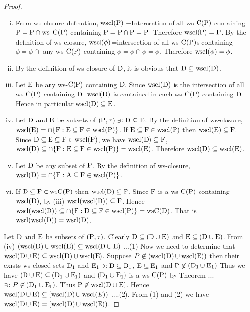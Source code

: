 \begin{proof}
\begin{enumerate}[(i)]
\item From ws-closure defination, $\mathrm{wscl}(\mathrm{P})$ =Intersection of all ws-$\mathrm{C}(\mathrm{P})$ containing $\mathrm{P} =\mathrm{P} \cap \mathrm{ws}$-$\mathrm{C}(\mathrm{P})$ containing $\mathrm{P}=\mathrm{P}\cap \mathrm{P} =\mathrm{P}$, Therefore $\mathrm{wscl}(\mathrm{P})=\mathrm{P}$. By the definition of ws-closure, $\mathrm{wscl}(\phi)$=intersection of all ws-$\mathrm{C}(\mathrm{P})$s containing $\phi =\phi\cap$  any ws-$\mathrm{C}(\mathrm{P})$ containing $\phi= \phi\cap \phi=\phi$. Therefore $\mathrm{wscl}(\phi)=\phi$.

\item By the definition of ws-closure of $\mathrm{D}$, it is obvious that $\mathrm{D}\subseteq  \mathrm{wscl}(\mathrm{D})$.

\item Let $\mathrm{E}$ be any ws-$\mathrm{C}(\mathrm{P})$ containing $\mathrm{D}$. Since $\mathrm{wscl}(\mathrm{D})$ is the intersection of all ws-$\mathrm{C}(\mathrm{P})$ containing $\mathrm{D}$. $\mathrm{wscl}(\mathrm{D})$ is contained in each ws-$\mathrm{C}(\mathrm{P})$ containing $\mathrm{D}$. Hence in particular $\mathrm{wscl}(\mathrm{D})\subseteq \mathrm{E}$.

\item Let $\mathrm{D}$ and $\mathrm{E}$  be subsets of $(\mathrm{P},\tau) \ni: \mathrm{D}\subseteq \mathrm{E}$. By the definition of ws-closure, $\mathrm{wscl}(\mathrm{E})=\cap \{\mathrm{F}: \mathrm{E}\subseteq \mathrm{F}\in \mathrm{wscl}(\mathrm{P})\}$. If $\mathrm{E}\subseteq \mathrm{F}\in \mathrm{wscl}(\mathrm{P})$ then $\mathrm{wscl}(\mathrm{E})\subseteq \mathrm{F}$. Since $\mathrm{D}\subseteq \mathrm{E} \subseteq \mathrm{F}\in \mathrm{wscl}(\mathrm{P})$, we have $\mathrm{wscl}(\mathrm{D})\subseteq \mathrm{F}$, $\mathrm{wscl}(\mathrm{D})\subseteq \cap \{\mathrm{F}: \mathrm{E}\subseteq \mathrm{F}\in \mathrm{wscl}(\mathrm{P})\}=\mathrm{wscl}(\mathrm{E})$. Therefore $\mathrm{wscl}(\mathrm{D})\subseteq \mathrm{wscl}(\mathrm{E})$.

\item Let $\mathrm{D}$ be any subset of $\mathrm{P}$. By the definition of ws-closure, $\mathrm{wscl}(\mathrm{D})=\cap \{\mathrm{F}: \mathrm{A}\subseteq \mathrm{F} \in \mathrm{wscl}(\mathrm{P})\}$.

\item If $\mathrm{D}\subseteq \mathrm{F}\in \mathrm{ws}\mathrm{C}(\mathrm{P})$ then $\mathrm{wscl}(\mathrm{D})\subseteq \mathrm{F}$. Since $\mathrm{F}$ is a ws-$\mathrm{C}(\mathrm{P})$ containing $\mathrm{wscl}(\mathrm{D})$, by (iii) $\mathrm{wscl}(\mathrm{wscl}(\mathrm{D}))\subseteq \mathrm{F}$. Hence $\mathrm{wscl}(\mathrm{wscl}(\mathrm{D}))\subseteq \cap \{\mathrm{F}: \mathrm{D}\subseteq \mathrm{F}\in \mathrm{wscl}(\mathrm{P})\}=\mathrm{ws} \mathrm{C}(\mathrm{D})$. That is $\mathrm{wscl}(\mathrm{wscl}(\mathrm{D}))=\mathrm{wscl}(\mathrm{D})$. 
\end{enumerate}

Let $\mathrm{D}$ and $\mathrm{E}$  be subsets of $(\mathrm{P},\tau)$. Clearly $\mathrm{D}\subseteq (\mathrm{D}\cup \mathrm{E})$ and $\mathrm{E}\subseteq (\mathrm{D}\cup \mathrm{E})$. From (iv) $(\mathrm{wscl}(\mathrm{D})\cup \mathrm{wscl}(\mathrm{E}))\subseteq \mathrm{wscl}(\mathrm{D}\cup \mathrm{E})$ ...(1) Now we need to determine that $\mathrm{wscl}(\mathrm{D}\cup \mathrm{E})\subseteq \mathrm{wscl}(\mathrm{D})\cup \mathrm{wscl}(\mathrm{E})$. Suppose $P\not\in (\mathrm{wscl}(\mathrm{D})\cup \mathrm{wscl}(\mathrm{E}))$ then their exists ws-closed sets $\mathrm{D}_{1}$ and $\mathrm{E}_{1}\ni: \mathrm{D}\subseteq \mathrm{D}_{1}$, $\mathrm{E}\subseteq \mathrm{E}_{1}$ and $\mathrm{P}\not\in (\mathrm{D}_{1} \cup \mathrm{E}_{1})$ Thus we have $(\mathrm{D}\cup \mathrm{E})\subseteq (\mathrm{D}_{1} \cup \mathrm{E}_{1})$ and $(\mathrm{D}_{1} \cup \mathrm{E}_{1})$ is a ws-$\mathrm{C}(\mathrm{P})$ by Theorem ... $\ni: P\not\in (\mathrm{D}_{1} \cup \mathrm{E}_{1})$. Thus $\mathrm{P}\not\in \mathrm{wscl}(\mathrm{D}\cup \mathrm{E})$. Hence $\mathrm{wscl}(\mathrm{D}\cup \mathrm{E})\subseteq (\mathrm{wscl}(\mathrm{D})\cup \mathrm{wscl}(E))$ ....(2). From (1) and (2) we have $\mathrm{wscl}(\mathrm{D}\cup \mathrm{E})=(\mathrm{wscl}(\mathrm{D})\cup \mathrm{wscl}(\mathrm{E}))$.
\end{proof}

